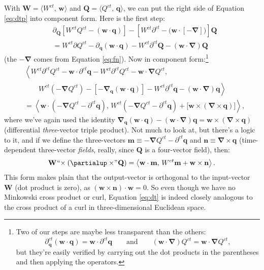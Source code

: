 \documentclass[12pt]{article}
\renewcommand{\vv}[1]{\mathbf{#1}}
\newcommand{\del}{\boldsymbol{\nabla}}
\begin{document}
With $\vv W = \langle W^{ct}, \, \vv w \rangle$ and $\vv Q = \langle Q^{ct} , \, \vv q \rangle$, we can put the right side of Equation \ref{eq:dtp} into component form. Here is the first step:
\begin{equation*}
\begin{split}
&\partialup_{\vv Q} \left[ W^{ct} Q^{ct} - \left( \vv w \cdot \vv q \right) \right] - \left[ W^{ct} \partial^{ct} - \big(  \vv w \cdot [ - \del ] \big) \right] \vv Q \\[5pt]
&= W^{ct} \partialup Q^{ct} - \partialup_{\vv q} ( \vv w \cdot \vv q ) - W^{ct} \partial^{ct} \vv Q - ( \vv w \cdot \del ) \vv Q
\end{split}
\end{equation*}
(the $-\del$ comes from Equation \ref{eq:fn}). Now in component form:\footnote{Two of our steps are maybe less transparent than the others:
\begin{equation*}
\partial^{ct}_{\vv q} \left( \vv w \cdot \vv q \right) = \vv w \cdot \partial^{ct} \vv q \qquad \textrm{and} \qquad (\vv w \cdot \del) Q^{ct} = \vv w \cdot \del Q^{ct} ,
\end{equation*}
but they're easily verified by carrying out the dot products in the parentheses and then applying the operators.
}
\begin{equation*}
\begin{split}
& \left \langle W^{ct} \partial^{ct} Q^{ct} - \vv w \cdot \partial^{ct} \vv q - W^{ct} \partial^{ct} Q^{ct} - \vv w \cdot \del Q^{ct} , \right. \\[3pt]
& \qquad \left. W^{ct} (- \del Q^{ct}) - [- \del_{\vv q} (\vv w \cdot \vv q)]  -  W^{ct} \partial^{ct} \vv q - (\vv w \cdot \del) \vv q \right \rangle \\[5pt]
&= \left \langle \vv w \cdot \left( - \del Q^{ct} - \partial^{ct} \vv q  \right) , \, W^{ct} \left( - \del Q^{ct} - \partial^{ct} \vv q \right) + \big[ \vv w \times (\del \times \vv q) \big] \right \rangle ,
\end{split}
\end{equation*}
where we've again used the identity $\del_{\vv q} (\vv w \cdot \vv q) - (\vv w \cdot \del) \vv q = \vv w \times (\del \times \vv q)$ (differential \emph{three}-vector triple product). Not much to look at, but there's a logic to it, and if we define the three-vectors ${\vv m \equiv - \del Q^{ct} - \partial^{ct} \vv q}$ and ${\vv n \equiv \del \times \vv q}$ (time-dependent three-vector \emph{fields}, really, since $\vv Q$ is a four-vector field), then:
\begin{equation}\label{eq:dt}
\vv W \mkern1mu `` \mkern-4mu \times (\partialup \times \mkern-4mu " \mkern1mu \vv Q) = \left \langle \vv w \cdot \vv m , \, W^{ct} \vv m + \vv w \times \vv n \right \rangle .
\end{equation}
This form makes plain that the output-vector is orthogonal to the input-vector $\vv W$ (dot product is zero), as $(\vv w \times \vv n) \cdot \vv w = 0$. So even though we have no Minkowski cross product or curl, Equation \ref{eq:dt} is indeed closely analogous to the cross product of a curl in three-dimensional Euclidean space.
\end{document}
